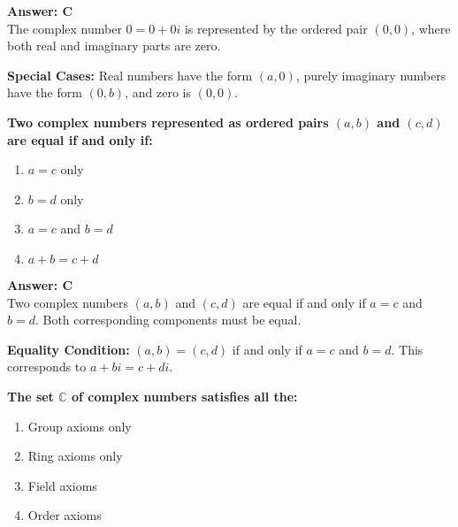 \documentclass[12pt,a4paper]{article}
\begin{document}
\begin{answerstyle}
\textbf{Answer: C} \\
The complex number \( 0 = 0 + 0i \) is represented by the ordered pair \( (0, 0) \), where both real and imaginary parts are zero.
\end{answerstyle}

\begin{conceptbox}
\textbf{Special Cases:} Real numbers have the form \( (a, 0) \), purely imaginary numbers have the form \( (0, b) \), and zero is \( (0, 0) \).
\end{conceptbox}

\newpage
\begin{questiontitle}[MCQ 54]
\textbf{Two complex numbers represented as ordered pairs \( (a, b) \) and \( (c, d) \) are equal if and only if:}
\end{questiontitle}

\begin{partbox}[Options]
\begin{enumerate}[label=\Alph*.]
    \item \( a = c \) only
    \item \( b = d \) only
    \item \( a = c \) and \( b = d \)
    \item \( a + b = c + d \)
\end{enumerate}
\end{partbox}

\begin{answerstyle}
\textbf{Answer: C} \\
Two complex numbers \( (a, b) \) and \( (c, d) \) are equal if and only if \( a = c \) and \( b = d \). Both corresponding components must be equal.
\end{answerstyle}

\begin{conceptbox}
\textbf{Equality Condition:} \( (a, b) = (c, d) \) if and only if \( a = c \) and \( b = d \). This corresponds to \( a + bi = c + di \).
\end{conceptbox}

\newpage
\begin{questiontitle}[MCQ 55]
\textbf{The set \( \mathbb{C} \) of complex numbers satisfies all the:}
\end{questiontitle}

\begin{partbox}[Options]
\begin{enumerate}[label=\Alph*.]
    \item Group axioms only
    \item Ring axioms only
    \item Field axioms
    \item Order axioms
\end{enumerate}
\end{partbox}
\end{document}
